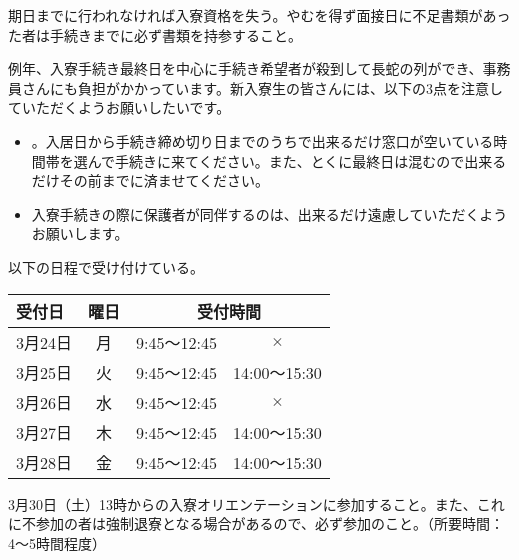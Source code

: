 \newpage 
{}
		期日までに行われなければ入寮資格を失う。やむを得ず面接日に不足書類があった者は手続きまでに必ず書類を持参すること。
		
		例年、入寮手続き最終日を中心に手続き希望者が殺到して長蛇の列ができ、事務員さんにも負担がかかっています。新入寮生の皆さんには、以下の3点を注意していただくようお願いしたいです。
		\begin{itemize}
		    \item {}。入居日から手続き締め切り日までのうちで出来るだけ窓口が空いている時間帯を選んで手続きに来てください。また、とくに最終日は混むので出来るだけその前までに済ませてください。
		    \item 入寮手続きの際に保護者が同伴するのは、出来るだけ遠慮していただくようお願いします。
		\end{itemize}
        
  以下の日程で受け付けている。
\begin{table}[h]
  \begin{tabular}{|l|c|c|c|}
    \hline
    受付日 & 曜日  & \multicolumn{2}{|c|}{受付時間}                  \\ \hline \hline
    
    3月24日 & 月 & 9:45〜12:45 & $ \times $   \\ \hline
    3月25日 & 火 & 9:45〜12:45 & 14:00〜15:30\\ \hline
    3月26日 & 水 & 9:45〜12:45 & $ \times $\\ \hline
    3月27日 & 木 & 9:45〜12:45 & 14:00〜15:30  \\ \hline
    3月28日 & 金 & 9:45〜12:45 & 14:00〜15:30  \\ \hline
     \hline
  \end{tabular}
\end{table}

	3月30日（土）13時からの入寮オリエンテーションに参加すること。また、これに不参加の者は強制退寮となる場合があるので、必ず参加のこと。（所要時間：4〜5時間程度）

